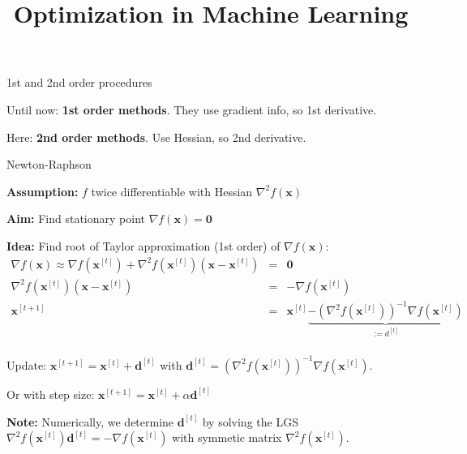 \documentclass[11pt,compress,t,notes=noshow, xcolor=table]{beamer}
\title{Optimization in Machine Learning}
\date{}
\begin{document}
\sloppy

\begin{vbframe}{1st and 2nd order procedures}

Until now: \textbf{1st order methods}. 
They use gradient info, so 1st derivative. 

\lz

Here: \textbf{2nd order methods}. Use Hessian, so 2nd derivative. 

\end{vbframe}

\begin{vbframe}{Newton-Raphson}

\textbf{Assumption:} $f$ twice differentiable with Hessian $\nabla^2 f(\bm{x})$

\lz

\textbf{Aim:} Find stationary point $\nabla f(\bm{x}) = \bm{0}$
\lz 

\textbf{Idea:} Find root of Taylor approximation (1st order) of $\nabla f(\bm{x})$:
\begin{eqnarray*}
\nabla f(\mathbf{x}) \approx \nabla f(\mathbf{x}^{[t]}) +
\nabla^2 f(\mathbf{x}^{[t]})(\mathbf{x} - \mathbf{x}^{[t]}) &=& \mathbf{0} \\
\nabla^2 f(\mathbf{x}^{[t]})(\mathbf{x} - \mathbf{x}^{[t]}) &=& - \nabla f(\mathbf{x}^{[t]}) \\
\mathbf{x}^{[t+1]} &=& \mathbf{x}^{[t]} \underbrace{- \left(\nabla^2 f(\mathbf{x}^{[t]})\right)^{-1}\nabla f(\mathbf{x}^{[t]})}_{:= d^{[t]}} \\
\end{eqnarray*}

\vspace*{-0.2cm}

Update: $\bm{x}^{[t+1]} = \bm{x}^{[t]} + \bm{d}^{[t]}$ with $\bm{d}^{[t]} =  \left(\nabla^2 f(\mathbf{ x}^{[t]})\right)^{-1}\nabla f(\mathbf{x}^{[t]})$.

Or with step size: $\bm{x}^{[t+1]} = \bm{x}^{[t]} + \alpha \bm{d}^{[t]}$ 

\vspace*{0.3cm}

\textbf{Note: } Numerically, we determine $\bm{d}^{[t]}$ by solving the LGS $\nabla^2 f(\mathbf{x}^{[t]})\bm{d}^{[t]} = - \nabla f(\mathbf{x}^{[t]})$ with symmetic matrix $\nabla^2 f(\mathbf{x}^{[t]})$. 



\end{vbframe}
\end{document}
